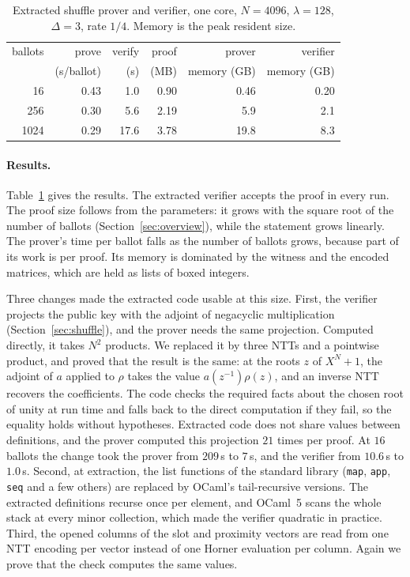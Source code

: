 \documentclass[sigconf,anonymous]{acmart}
\newcommand{\xbProveA}{0.30}  %
\newcommand{\xbVerA}{5.6}    %
\newcommand{\xbSizeA}{2.19}  %
\begin{document}
\begin{table}[t]
\caption{Extracted shuffle prover and verifier, one core, $N=4096$, $\lambda=128$, $\Delta=3$,
rate $1/4$. Memory is the peak resident size.}
\label{tab:xbench}
\small
\begin{tabular}{@{}rrrrrr@{}}
\toprule
ballots & prove & verify & proof & prover & verifier\\
 & (s/ballot) & (s) & (MB) & memory (GB) & memory (GB)\\
\midrule
16  & 0.43 & 1.0 & 0.90 & 0.46 & 0.20\\
256 & \xbProveA & \xbVerA & \xbSizeA & 5.9 & 2.1\\
1024 & 0.29 & 17.6 & 3.78 & 19.8 & 8.3\\
\bottomrule
\end{tabular}
\end{table}

\paragraph{Results.}
Table~\ref{tab:xbench} gives the results. The extracted verifier accepts the proof in every run. The
proof size follows from the parameters: it grows with the square root of the number of ballots
(Section~\ref{sec:overview}), while the statement grows linearly. The prover's time per ballot falls
as the number of ballots grows, because part of its work is per proof. Its memory is dominated by the
witness and the encoded matrices, which are held as lists of boxed integers.

Three changes made the extracted code usable at this size. First, the verifier projects the public
key with the adjoint of negacyclic multiplication (Section~\ref{sec:shuffle}), and the prover needs
the same projection. Computed directly, it takes $N^2$ products. We replaced it by three NTTs and a
pointwise product, and proved that the result is the same: at the roots $z$ of $X^N+1$, the adjoint
of $a$ applied to $\rho$ takes the value $a(z^{-1})\rho(z)$, and an inverse NTT recovers the
coefficients. The code checks the required facts about the chosen root of unity at run time and
falls back to the direct computation if they fail, so the equality holds without hypotheses.
Extracted code does not share values between definitions, and the prover computed this projection
$21$ times per proof. At $16$ ballots the change took the prover from $209$\,s to $7$\,s, and the
verifier from $10.6$\,s to $1.0$\,s. Second, at extraction, the list functions of the standard
library (\texttt{map}, \texttt{app}, \texttt{seq} and a few others) are replaced by OCaml's
tail-recursive versions. The extracted definitions recurse once per element, and OCaml~5 scans the
whole stack at every minor collection, which made the verifier quadratic in practice. Third, the
opened columns of the slot and proximity vectors are read from one NTT encoding per vector instead of
one Horner evaluation per column. Again we prove that the check computes the same values.
\end{document}
